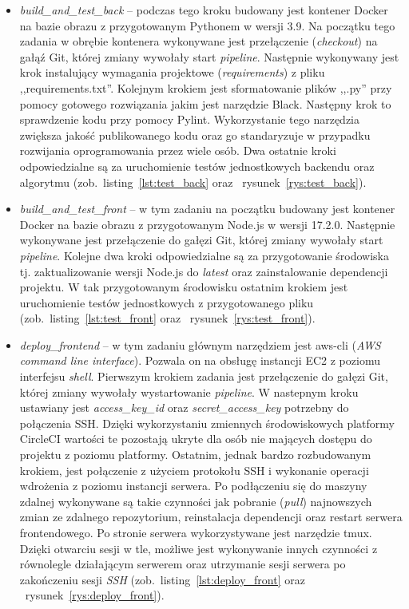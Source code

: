 \newpage
\begin{itemize}
	\item \textit{build\_and\_test\_back} -- podczas tego kroku budowany jest kontener Docker na bazie obrazu z przygotowanym Pythonem w wersji 3.9. Na początku tego zadania w obrębie kontenera wykonywane jest przełączenie (\textit{checkout}) na gałąź Git, której zmiany wywołały start \textit{pipeline}. Następnie wykonywany jest krok instalujący wymagania projektowe (\textit{requirements}) z pliku ,,requirements.txt''. Kolejnym krokiem jest sformatowanie plików ,,.py'' przy pomocy gotowego rozwiązania jakim jest narzędzie Black. Następny krok to sprawdzenie kodu przy pomocy Pylint. Wykorzystanie tego narzędzia zwiększa jakość publikowanego kodu oraz go standaryzuje w przypadku rozwijania oprogramowania przez wiele osób. Dwa ostatnie kroki odpowiedzialne są za uruchomienie testów jednostkowych backendu oraz algorytmu (zob.~listing~\ref{lst:test_back} oraz ~rysunek~\ref{rys:test_back}).
	\item \textit{build\_and\_test\_front} -- w tym zadaniu na początku budowany jest kontener Docker na bazie obrazu z przygotowanym Node.js w wersji 17.2.0. Następnie wykonywane jest przełączenie do gałęzi Git, której zmiany wywołały start \textit{pipeline}.  Kolejne dwa kroki odpowiedzialne są za przygotowanie środowiska tj. zaktualizowanie wersji Node.js do \textit{latest} oraz zainstalowanie dependencji projektu. W tak przygotowanym środowisku ostatnim krokiem jest uruchomienie testów jednostkowych z przygotowanego pliku (zob.~listing~\ref{lst:test_front} oraz ~rysunek~\ref{rys:test_front}).
	\item \textit{deploy\_frontend} -- w tym zadaniu głównym narzędziem jest aws-cli (\textit{AWS command line interface}). Pozwala on na obsługę instancji EC2 z poziomu interfejsu \textit{shell}. Pierwszym krokiem zadania jest przełączenie do gałęzi Git, której zmiany wywołały wystartowanie \textit{pipeline}. W nastepnym kroku ustawiany jest \textit{access\_key\_id} oraz \textit{secret\_access\_key} potrzebny do połączenia SSH. Dzięki wykorzystaniu zmiennych środowiskowych platformy CircleCI wartości te pozostają ukryte dla osób nie mających dostępu do projektu z poziomu platformy. Ostatnim, jednak bardzo rozbudowanym krokiem, jest połączenie z użyciem protokołu SSH i wykonanie operacji wdrożenia z poziomu instancji serwera. Po podłączeniu się do maszyny zdalnej wykonywane są takie czynności jak pobranie (\textit{pull}) najnowszych zmian ze zdalnego repozytorium, reinstalacja dependencji oraz restart serwera frontendowego. Po stronie serwera wykorzystywane jest narzędzie tmux. Dzięki otwarciu sesji w tle, możliwe jest wykonywanie innych czynności z równolegle działającym serwerem oraz utrzymanie sesji serwera po zakończeniu sesji \textit{SSH} (zob.~listing~\ref{lst:deploy_front} oraz ~rysunek~\ref{rys:deploy_front}).

\end{itemize}
